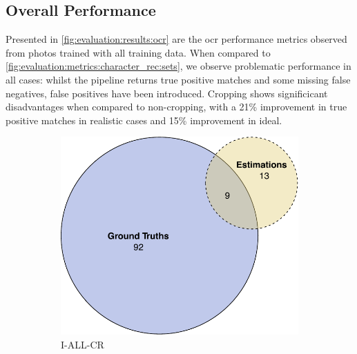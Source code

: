 \subsection{Overall Performance}

Presented in \cref{fig:evaluation:results:ocr} are the \gls{ocr} performance metrics observed from photos trained with all training data. When compared to \cref{fig:evaluation:metrics:character_rec:sets}, we observe problematic performance in all cases: whilst the pipeline returns true positive matches and some missing false negatives, false positives have been introduced. Cropping shows significicant disadvantages when compared to non-cropping, with a 21\% improvement in true positive matches in realistic cases and 15\% improvement in ideal.

\begin{figure}[h]
  \centering
  \hspace{\fill}
  \begin{subfigure}[b]{0.475\textwidth}
    \includegraphics[width=\textwidth]{images/evaluation/ocr_overlap_i_all_cr}
    \caption{I-ALL-CR}
    \label{fig:evaluation:results:ocr:i_all_cr}
  \end{subfigure}
  \hspace{\fill}
  \begin{subfigure}[b]{0.475\textwidth}

\end{subfigure}
\end{figure}
